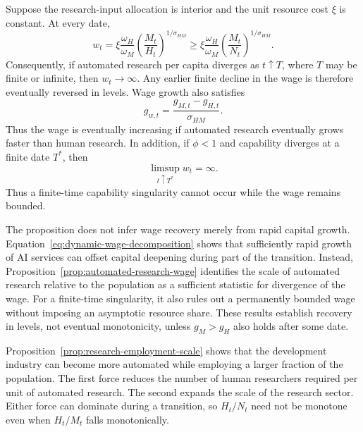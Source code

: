 \begin{proposition}
\label{prop:automated-research-wage}
Suppose the research-input allocation is interior and the unit resource cost
$\xi$ is constant. At every date,
\begin{equation}
    w_t
    =
    \xi\frac{\omega_H}{\omega_M}
    \left(\frac{M_t}{H_t}\right)^{1/\sigma_{HM}}
    \geq
    \xi\frac{\omega_H}{\omega_M}
    \left(\frac{M_t}{N_t}\right)^{1/\sigma_{HM}}.
    \label{eq:wage-automated-research-lower-bound}
\end{equation}
Consequently, if automated research per capita diverges as $t\uparrow T$, where
$T$ may be finite or infinite, then $w_t\to\infty$. Any earlier finite decline in
the wage is therefore eventually reversed in levels. Wage growth also satisfies
\begin{equation}
    g_{w,t}=\frac{g_{M,t}-g_{H,t}}{\sigma_{HM}}.
    \label{eq:wage-research-scale-growth}
\end{equation}
Thus the wage is eventually increasing if automated research eventually grows
faster than human research. In addition, if $\phi<1$ and capability diverges at a
finite date $T^*$, then
\begin{equation}
    \limsup_{t\uparrow T^*}w_t=\infty.
    \label{eq:finite-singularity-wage-unbounded}
\end{equation}
Thus a finite-time capability singularity cannot occur while the wage remains
bounded.
\end{proposition}

The proposition does not infer wage recovery merely from rapid capital growth.
Equation~\eqref{eq:dynamic-wage-decomposition} shows that sufficiently rapid growth
of AI services can offset capital deepening during part of the transition. Instead,
Proposition~\ref{prop:automated-research-wage} identifies the scale of automated
research relative to the population as a sufficient statistic for divergence of
the wage. For a finite-time singularity, it also rules out a permanently bounded
wage without imposing an asymptotic resource share. These results establish
recovery in levels, not eventual monotonicity, unless $g_M>g_H$ also holds after
some date.

Proposition~\ref{prop:research-employment-scale} shows that the development industry
can become more automated while employing a larger fraction of the population. The
first force reduces the number of human researchers required per unit of automated
research. The second expands the scale of the research sector. Either force can
dominate during a transition, so $H_t/N_t$ need not be monotone even when $H_t/M_t$
falls monotonically.

